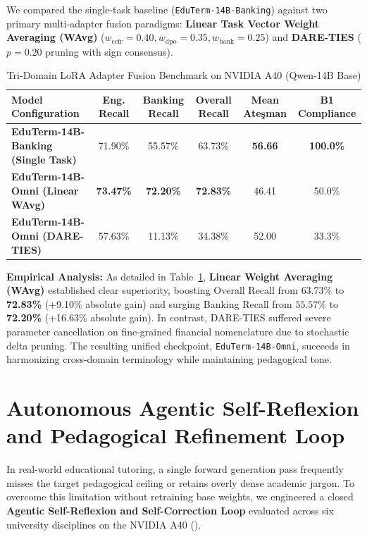 \documentclass[a4paper,12pt]{report}
\begin{document}
We compared the single-task baseline (\texttt{EduTerm-14B-Banking}) against two primary multi-adapter fusion paradigms: \textbf{Linear Task Vector Weight Averaging (WAvg)} ($w_{\text{cefr}}=0.40, w_{\text{dpo}}=0.35, w_{\text{bank}}=0.25$) and \textbf{DARE-TIES} ($p=0.20$ pruning with sign consensus).

\begin{table}[htbp]
\centering
\small
\caption{Tri-Domain LoRA Adapter Fusion Benchmark on NVIDIA A40 (Qwen-14B Base)}
\label{tab:tri_domain_merging}
\scriptsize\setlength{\tabcolsep}{2pt}
\begin{tabularx}{\textwidth}{>{\RaggedRight\arraybackslash}Xccccc}
\hline
\textbf{Model Configuration} & \textbf{Eng. Recall} & \textbf{Banking Recall} & \textbf{Overall Recall} & \textbf{Mean Ateşman} & \textbf{B1 Compliance} \\
\hline
\textbf{EduTerm-14B-Banking (Single Task)} & 71.90\% & 55.57\% & 63.73\% & \textbf{56.66} & \textbf{100.0\%} \\
\textbf{EduTerm-14B-Omni (Linear WAvg)} & \textbf{73.47\%} & \textbf{72.20\%} & \textbf{72.83\%} & 46.41 & 50.0\% \\
\textbf{EduTerm-14B-Omni (DARE-TIES)} & 57.63\% & 11.13\% & 34.38\% & 52.00 & 33.3\% \\
\hline
\end{tabularx}
\end{table}

\textbf{Empirical Analysis:} As detailed in Table~\ref{tab:tri_domain_merging}, \textbf{Linear Weight Averaging (WAvg)} established clear superiority, boosting Overall Recall from $63.73\%$ to \textbf{72.83\%} (+9.10\% absolute gain) and surging Banking Recall from $55.57\%$ to \textbf{72.20\%} (+16.63\% absolute gain). In contrast, DARE-TIES suffered severe parameter cancellation on fine-grained financial nomenclature due to stochastic delta pruning. The resulting unified checkpoint, \texttt{EduTerm-14B-Omni}, succeeds in harmonizing cross-domain terminology while maintaining pedagogical tone.

\section{Autonomous Agentic Self-Reflexion and Pedagogical Refinement Loop}
\label{sec:self_reflexion}
In real-world educational tutoring, a single forward generation pass frequently misses the target pedagogical ceiling or retains overly dense academic jargon. To overcome this limitation without retraining base weights, we engineered a closed \textbf{Agentic Self-Reflexion and Self-Correction Loop} evaluated across six university disciplines on the NVIDIA A40 ().
\end{document}
